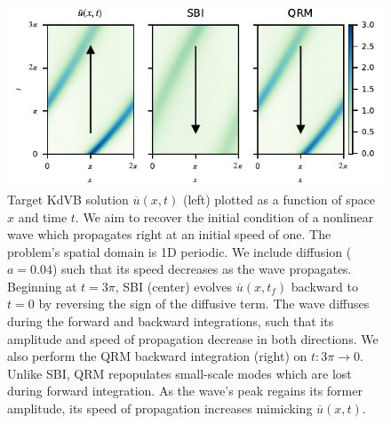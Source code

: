 \documentclass[%
 reprint,
 amsmath,amssymb,
 aps,
 pre,
]{revtex4-2}
\begin{document}
\begin{figure}
  \centering
  \includegraphics[width=5in]{all.pdf}
  \caption{Target KdVB solution $\overline{u}(x,t)$ (left) plotted as a function of space $x$ and time $t$.
  We aim to recover the initial condition of a nonlinear wave which propagates right at an initial speed of one. 
The problem's spatial domain is 1D periodic. 
We include diffusion ($a=0.04$) such that its speed decreases as the wave propagates. 
Beginning at $t=3\pi$, SBI (center) evolves $\overline{u}(x,t_f)$ backward to $t=0$ by reversing the sign of the diffusive term.
The wave diffuses during the forward and backward integrations, such that its amplitude and speed of propagation decrease in both directions.
We also perform the QRM backward integration (right) on $t:3\pi\to 0$. 
Unlike SBI, QRM repopulates small-scale modes which are lost during forward integration. 
As the wave's peak regains its former amplitude, its speed of propagation increases mimicking $\overline{u}(x,t)$.
}
  \label{targy}
\end{figure}
\end{document}
